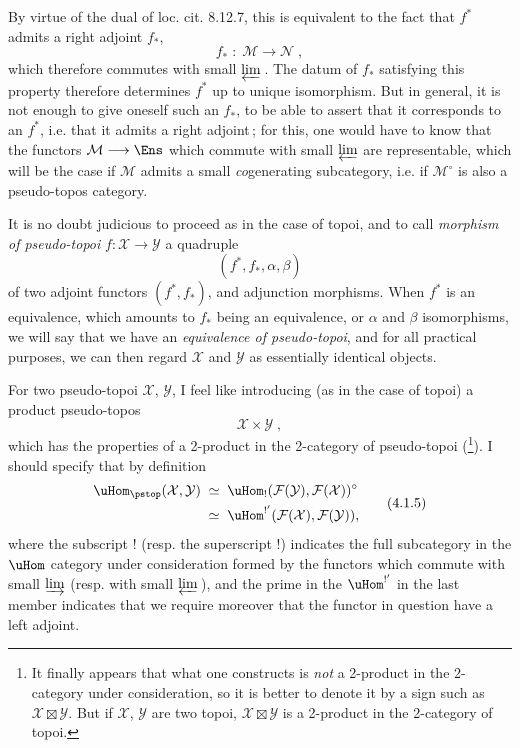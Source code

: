 By virtue of the dual of loc. cit. 8.12.7, this is equivalent to the fact that $f^*$ admits a right adjoint $f_*$,
\[
f_* \;:\; \mathcal{M} \longrightarrow \mathcal{N}\;,
\tag*{(4.1.2)}
\]
which therefore commutes with small $\varprojlim$\,. The datum of $f_*$ satisfying this property therefore determines $f^*$ up to unique isomorphism. But in general, it is not enough to give oneself such an $f_*$, to be able to assert that it corresponds to an $f^*$, i.e. that it admits a right adjoint\,; for this, one would have to know that the functors $\mathcal{M}\longrightarrow\Ens$ which commute with small $\varprojlim$ are representable, which will be the case if $\mathcal{M}$ admits a small \textit{co}generating subcategory, i.e. if $\mathcal{M}^\circ$ is also a pseudo-topos category. %

\newpage


It is no doubt judicious to proceed as in the case of topoi, and to call \textit{morphism of pseudo-topoi} $f:\mathcal{X}\longrightarrow\mathcal{Y}$ a quadruple
\[
(f^*,f_*,\alpha,\beta)
\tag*{(4.1.3)}
\]
of two adjoint functors $(f^*,f_*)$, and adjunction morphisms. When $f^*$ is an equivalence, which amounts to $f_*$ being an equivalence, or $\alpha$ and $\beta$ isomorphisms, we will say that we have an \textit{equivalence of pseudo-topoi}, and for all practical purposes, we can then regard $\mathcal{X}$ and $\mathcal{Y}$ as essentially identical objects.

For two pseudo-topoi $\mathcal{X}$, $\mathcal{Y}$, I feel like introducing (as in the case of topoi) a product pseudo-topos
\[
\mathcal{X}\times\mathcal{Y}\;,
\tag*{(4.1.4)}
\]
which has the properties of a 2-product in the 2-category of pseudo-topoi (\footnote{It finally appears that what one constructs is \textit{not} a 2-product in the 2-category under consideration, so it is better to denote it by a sign such as $\mathcal{X}\boxtimes\mathcal{Y}$. But if $\mathcal{X}$, $\mathcal{Y}$ are two topoi, $\mathcal{X}\boxtimes\mathcal{Y}$ is a 2-product in the 2-category of topoi.}). I should specify that by definition
\[
\begin{aligned}
\uHom_{\pstop}(\mathcal{X},\mathcal{Y}) \;&\simeq\; \uHom_!(\mathcal{F}(\mathcal{Y}),\mathcal{F}(\mathcal{X}))^\circ\\
&\simeq\; \uHom^{!'}(\mathcal{F}(\mathcal{X}),\mathcal{F}(\mathcal{Y})),
\end{aligned}
\tag*{(4.1.5)}
\]
where the subscript ! (resp. the superscript !) indicates the full subcategory in the $\uHom$ category under consideration formed by the functors which commute with small $\varinjlim$ (resp. with small
$\varprojlim$\,), and the prime in the $\uHom^{!'}$ in the last member indicates that we require moreover that the functor in question have a left adjoint.

